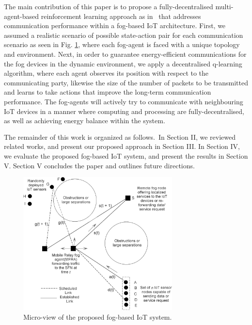 \documentclass[journal]{IEEEtran}
\begin{document}
The main contribution of this paper is to propose a fully-decentralised multi-agent-based reinforcement learning approach as in~\cite{Gueriau2018} that addresses communication performance within a fog-based IoT architecture. First, we assumed a realistic scenario of possible state-action pair for each communication scenario as seen in  Fig. \ref{ideafig1}, where each fog-agent is faced with a unique topology and environment. Next, in order to guarantee energy-efficient communications for the fog devices in the dynamic environment, we apply a decentralised q-learning algorithm, where each agent observes its position with respect to the communicating party, likewise the size of the number of packets to be transmitted and learns to take actions that improve the long-term communication performance. The fog-agents will actively try to communicate with neighbouring IoT devices in a manner where computing and processing are fully-decentralised, as well as achieving energy balance within the system.

The remainder of this work is organized as follows.~In Section II, we reviewed related works, and present our proposed approach in Section III. In Section IV, we evaluate the proposed fog-based IoT system, and present the results in Section V. Section V concludes the paper and outlines future directions.





\begin{figure}[!t]
\centering
\includegraphics[width=3.2in]{ideafig1.eps}
\caption{Micro-view of the proposed fog-based IoT system.}
\label{ideafig1}
\end{figure}
\end{document}
